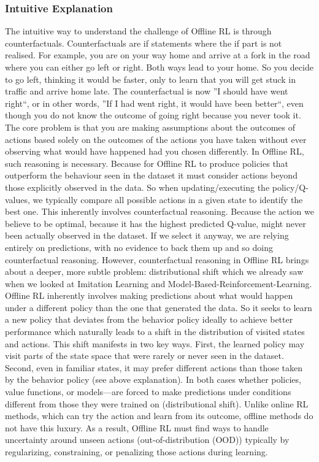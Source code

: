 \subsubsection{Intuitive Explanation}
The intuitive way to understand the challenge of Offline RL is through counterfactuals. Counterfactuals 
are if statements where the if part is not realised. For example, you are on your way home 
and arrive at a fork in the road where you can either go left or right. Both ways lead to 
your home. So you decide to go left, thinking it would be faster, only to learn that you will
get stuck in traffic and arrive home late. The counterfactual is now ''I should have went right``,
or in other words, ''If I had went right, it would have been better``, even though you do not know
the outcome of going right because you never took it. The core problem is that you are making 
assumptions about the outcomes of actions based solely on the outcomes of the actions you have 
taken without ever observing what would have happened had you chosen differently.\newline 
In Offline RL, such reasoning is necessary. Because for Offline RL to produce policies that outperform
the behaviour seen in the dataset it must consider actions beyond those explicitly observed in the data.
So when updating/executing the policy/Q-values, we typically compare all possible actions in a given state to 
identify the best one. This inherently involves counterfactual reasoning. Because the action we believe 
to be optimal, because it has the highest predicted Q-value, might never been actually observed in the dataset.
If we select it anyway, we are relying entirely on predictions, with no evidence to back them up and so doing
counterfactual reasoning.\newline 
However, counterfactual reasoning in Offline RL brings about a deeper, more subtle problem: distributional shift which 
we already saw when we looked at Imitation Learning and Model-Based-Reinforcement-Learning. Offline RL inherently involves 
making predictions about what would happen under a different policy than the one that generated the data. So it seeks 
to learn a new policy that deviates from the behavior policy ideally to achieve better performance which naturally leads to a 
shift in the distribution of visited states and actions. This shift manifests in two key ways. First, the learned policy may 
visit parts of the state space that were rarely or never seen in the dataset. Second, even in familiar states, it may prefer 
different actions than those taken by the behavior policy (see above explanation). In both cases whether policies, value 
functions, or models—are forced to make predictions under conditions different from those they were 
trained on (distributional shift).\newline
Unlike online RL methods, which can try the action and learn from its outcome, offline methods do not have this luxury. As a 
result, Offline RL must find ways to handle uncertainty around unseen actions (out-of-distribution (OOD)) typically by 
regularizing, constraining, or penalizing those actions during learning.

